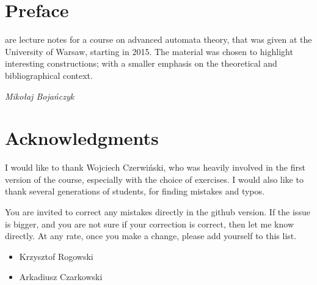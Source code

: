 \documentclass[b5paper,11pt]{book}
\begin{document}
\chapter*{Preface}%
{  \raggedright
{} are lecture notes for a course on advanced automata theory, that was given at the University of Warsaw, starting in 2015.  
The material was chosen to highlight interesting constructions; with a smaller emphasis on  the theoretical and bibliographical context.  




\bigskip
{\slshape  \noindent Miko{\l}aj Boja\'nczyk}


\cleardoublepage

%      
\chapter*{Acknowledgments}%
{  \raggedright
I would like to thank Wojciech Czerwi\'nski, who was heavily involved in the first version of the course, especially with the choice of exercises. I would also like to thank several generations of students, for finding mistakes and typos.

You are invited to correct any mistakes directly in the github version. If the issue is bigger, and you are not sure if your correction is correct, then let me know directly. At any rate, once you make a change, please add yourself to this list. 

\begin{itemize}
    \item Krzysztof Rogowski
    \item Arkadiusz Czarkowski
\end{itemize}




\cleardoublepage


%      
\tableofcontents
\thispagestyle{empty}

\mainmatter   %
\pagestyle{fancy}

\newcommand{\rozdzial}[2]{ 
\chapter{#1}
\seclabel{sec:#2}
\secintro{}

}

\newcommand{\bookcontent}{
\rozdzial{Presburger arithmetic}{presburger}
\rozdzial{First-order theory of the reals}{tarski}
\rozdzial{Zero-one laws}{random-graph}
\rozdzial{Weighted automata over a field}{linear-automata}
\rozdzial{Vector addition systems}{wqo}
\rozdzial{Polynomial grammars}{hilbert}


}}}
\end{document}
